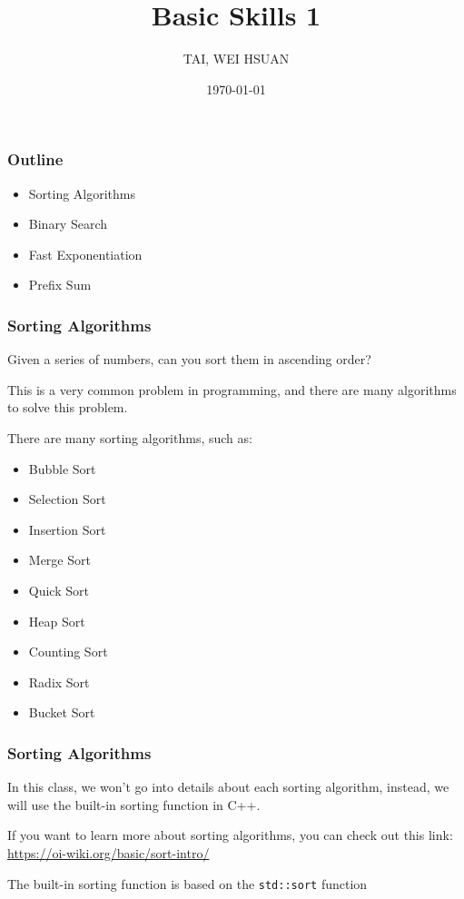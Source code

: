 \documentclass[xcolor=dvipsnames]{beamer}
\title{Basic Skills 1}
\author{TAI, WEI HSUAN}
\date{\today}
\begin{document}
	
	\begin{frame}
		\titlepage
	\end{frame}
	
	\begin{frame}
		\frametitle{Outline}
        \begin{itemize}
            \item Sorting Algorithms
            \item Binary Search
            \item Fast Exponentiation
            \item Prefix Sum
        \end{itemize}
	\end{frame}
	
    \begin{frame}
        \frametitle{Sorting Algorithms}
        Given a series of numbers, can you sort them in ascending order?

        This is a very common problem in programming,
        and there are many algorithms to solve this problem.

        There are many sorting algorithms, such as:
        \begin{itemize}
            \item Bubble Sort
            \item Selection Sort
            \item Insertion Sort
            \item Merge Sort
            \item Quick Sort
            \item Heap Sort
            \item Counting Sort
            \item Radix Sort
            \item Bucket Sort
        \end{itemize}
    \end{frame}

    \begin{frame}[fragile]
        \frametitle{Sorting Algorithms}
        In this class, we won't go into details about each sorting algorithm,
        instead, we will use the built-in sorting function in C++.
    
        If you want to learn more about sorting algorithms,
        you can check out this link: \url{https://oi-wiki.org/basic/sort-intro/}

        The built-in sorting function is based on the \texttt{std::sort} function
    \end{frame}
\end{document}
